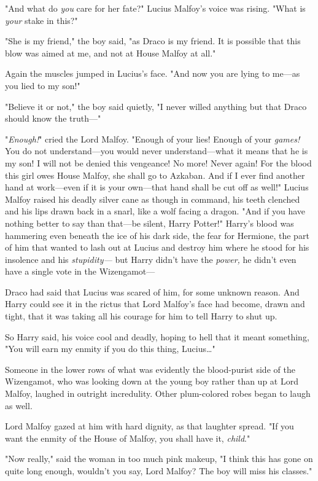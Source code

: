 "And what do \emph{you} care for her fate?" Lucius Malfoy's voice was rising.
"What is \emph{your} stake in this?"

"She is my friend," the boy said, "as Draco is my friend. It is possible that
this blow was aimed at me, and not at House Malfoy at all."

Again the muscles jumped in Lucius's face. "And now you are lying to me---as
you lied to my son!"

"Believe it or not," the boy said quietly, "I never willed anything but that
Draco should know the truth---"

"\emph{Enough!}" cried the Lord Malfoy. "Enough of your lies! Enough of your
\emph{games!} You do not understand---you would never understand---what it
means that he is my son! I will not be denied this vengeance! No more! Never
again! For the blood this girl owes House Malfoy, she shall go to Azkaban. And
if I ever find another hand at work---even if it is your own---that hand shall
be cut off as well!" Lucius Malfoy raised his deadly silver cane as though in
command, his teeth clenched and his lips drawn back in a snarl, like a wolf
facing a dragon. "And if you have nothing better to say than that---be silent,
Harry Potter!"
\later
Harry's blood was hammering even beneath the ice of his dark side, the fear for
Hermione, the part of him that wanted to lash out at Lucius and destroy him
where he stood for his insolence and his \emph{stupidity---} but Harry didn't
have the \emph{power,} he didn't even have a single vote in the Wizengamot---

Draco had said that Lucius was scared of him, for some unknown reason. And
Harry could see it in the rictus that Lord Malfoy's face had become, drawn and
tight, that it was taking all his courage for him to tell Harry to shut up.

So Harry said, his voice cool and deadly, hoping to hell that it meant
something, "You will earn my enmity if you do this thing, Lucius{\ldots}"

Someone in the lower rows of what was evidently the blood-purist side of the
Wizengamot, who was looking down at the young boy rather than up at Lord
Malfoy, laughed in outright incredulity. Other plum-colored robes began to
laugh as well.

Lord Malfoy gazed at him with hard dignity, as that laughter spread. "If you
want the enmity of the House of Malfoy, you shall have it, \emph{child}."

"Now really," said the woman in too much pink makeup, "I think this has gone on
quite long enough, wouldn't you say, Lord Malfoy? The boy will miss his
classes."

